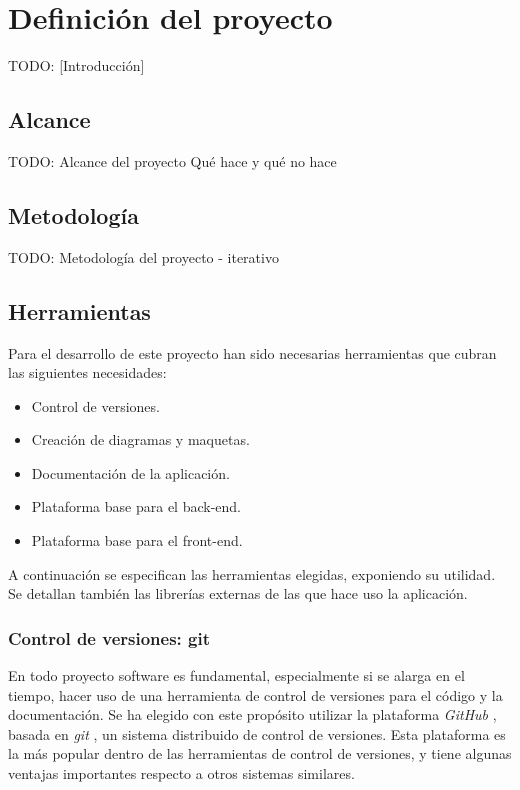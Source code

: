 \chapter{Definición del proyecto\label{cap:defProyecto}}

TODO: [Introducción]

\section{Alcance\label{sec:dp:alcance}}

TODO: Alcance del proyecto
Qué hace y qué no hace


\section{Metodología\label{sec:dp:metodologia}}

TODO: Metodología del proyecto - iterativo

\section{Herramientas\label{sec:dp:herramientas}}

Para el desarrollo de este proyecto han sido necesarias herramientas que cubran las siguientes necesidades:

\begin{itemize}
  \item Control de versiones.
  \item Creación de diagramas y maquetas.
  \item Documentación de la aplicación.
  \item Plataforma base para el \gls{back-end}.
  \item Plataforma base para el \gls{front-end}.
\end{itemize}

A continuación se especifican las herramientas elegidas, exponiendo su utilidad.
Se detallan también las librerías externas de las que hace uso la aplicación.

\subsection*{Control de versiones: git\label{ssec:dp:git}}

En todo proyecto software es fundamental, especialmente si se alarga en el tiempo, hacer uso de una herramienta de control de versiones para el código y la documentación. Se ha elegido con este propósito utilizar la plataforma \textit{GitHub} \cite{github}, basada en \textit{git} \cite{git}, un sistema distribuido de control de versiones.
Esta plataforma es la más popular dentro de las herramientas de control de versiones, y tiene algunas ventajas importantes respecto a otros sistemas similares.

